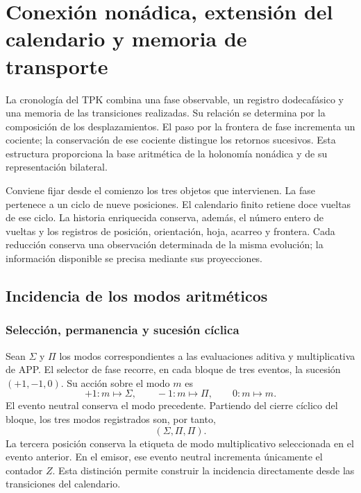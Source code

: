 \section{Conexión nonádica, extensión del calendario y memoria de transporte}
\label{cap:calendario}

La cronología del TPK combina una fase observable, un registro dodecafásico
y una memoria de las transiciones realizadas. Su relación se determina por
la composición de los desplazamientos. El paso por la frontera de fase
incrementa un cociente; la conservación de ese cociente distingue los
retornos sucesivos. Esta estructura proporciona la base aritmética de la
holonomía nonádica y de su representación bilateral.

Conviene fijar desde el comienzo los tres objetos que intervienen. La fase
pertenece a un ciclo de nueve posiciones. El calendario finito retiene doce
vueltas de ese ciclo. La historia enriquecida conserva, además, el número
entero de vueltas y los registros de posición, orientación, hoja, acarreo y
frontera. Cada reducción conserva una observación determinada de la misma
evolución; la información disponible se precisa mediante sus proyecciones.

\subsection{Incidencia de los modos aritméticos}
\label{sec:cal-incidencia}

\subsubsection{Selección, permanencia y sucesión cíclica}

Sean $\Sigma$ y $\Pi$ los modos correspondientes a las evaluaciones aditiva
y multiplicativa de APP. El selector de fase recorre, en cada bloque de tres
eventos, la sucesión $(+1,-1,0)$. Su acción sobre el modo $m$ es
\[
 +1:m\longmapsto\Sigma,\qquad
 -1:m\longmapsto\Pi,\qquad
 0:m\longmapsto m.
\]
El evento neutral conserva el modo precedente. Partiendo del cierre cíclico
del bloque, los tres modos registrados son, por tanto,
\[
 (\Sigma,\Pi,\Pi).
\]
La tercera posición conserva la etiqueta de modo multiplicativo
seleccionada en el evento anterior. En el emisor, ese evento neutral
incrementa únicamente el contador $Z$. Esta distinción permite
construir la incidencia directamente desde las transiciones del calendario.

